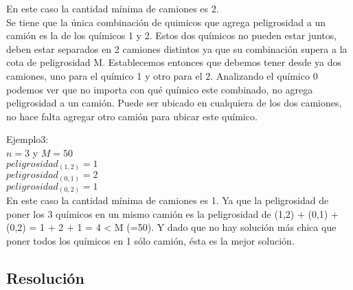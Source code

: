 \noindent
En este caso la cantidad m\'inima de camiones es 2. \\
Se tiene que la \'unica combinaci\'on de quimicos que agrega peligrosidad a un cami\'on es la de los qu\'imicos 1 y 2. Estos dos qu\'imicos no pueden estar juntos, deben estar separados en 2 camiones distintos ya que su combinaci\'on supera a la cota de peligrosidad M. Establecemos entonces que debemos tener desde ya dos camiones, uno para el qu\'imico 1 y otro para el 2. 
Analizando el qu\'imico 0 podemos ver que no importa con qu\'e qu\'imico este combinado, no agrega peligrosidad a un cami\'on. Puede ser ubicado en cualquiera de los dos camiones, no hace falta agregar otro cami\'on para ubicar este qu\'imico.
\bigskip
\bigskip

\noindent
Ejemplo3: \\
$n = 3$ y $M = 50$ \\
$peligrosidad_{(1,2)} = 1$ \\
$peligrosidad_{(0,1)} = 2$ \\ 
$peligrosidad_{(0,2)} = 1$ \\ 

\noindent
En este caso la cantidad m\'inima de camiones es 1. Ya que la peligrosidad de poner los 3 qu\'imicos en un mismo cami\'on es la peligrosidad de (1,2) + (0,1) + (0,2) = 1 + 2 + 1 = 4 < M (=50). Y dado que no hay soluci\'on m\'as chica que poner todos los qu\'imicos en 1 s\'olo cami\'on, \'esta es la mejor soluci\'on.
 
\subsection{Resoluci\'on}

